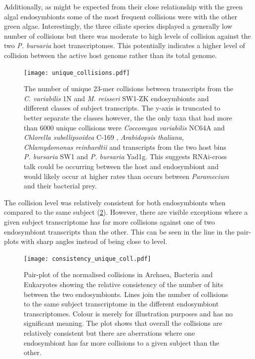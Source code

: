 Additionally, as might be expected from their close relationship with the 
green algal endosymbionts some of the most frequent collisions were 
with the other green algae.
Interestingly, the three ciliate species displayed a generally low number of collisions 
but there was moderate to high levels of collision against the two
\textit{P. bursaria} host transcriptomes.  This potentially
indicates a higher level of collision between the active host genome 
rather than its total genome.

\begin{figure}
    \texttt{[image: unique\_collisions.pdf]}
    \caption[Unique eDicer collisions by subject class]{The number of unique 23-mer
        collisions 
        between transcripts from the \textit{C. variabilis} 1N
    and \textit{M. reisseri} SW1-ZK endosymbionts and different
classes of subject transcripts.  The y-axis is truncated to better
separate the classes however, the the only taxa that had more than 6000
unique collisions were \textit{Coccomyxa variabilis} NC64A and \textit{Chlorella subellipsoidea} C-169
, \textit{Arabidopsis thaliana}, \textit{Chlamydomonas reinhardtii} and transcripts
from the two host bins \textit{P. bursaria} SW1 and \textit{P. bursaria} Yad1g.  
This suggests RNAi-cross talk could be occurring between the host and endosymbiont
and would likely occur at higher rates than occurs between \textit{Paramecium}
and their bacterial prey.}
\label{fig:unique_collisions}
\end{figure}

The collision level was relatively consistent for both endosymbionts
when compared to the same subject (\cref{fig:consistency_most}). 
However, there are visible exceptions where a given subject
transcriptome has far more collisions against one of two
endosymbiont transcripts than the other.  This can be seen
in the line in the pair-plots with sharp angles instead of
being close to level. 

\begin{figure}
    \centering
    \texttt{[image: consistency\_unique\_coll.pdf]}
    \caption[Pair-plot of normalised collisions in both transcriptomes]
    {Pair-plot of the normalised collisions in Archaea, Bacteria
    and Eukaryotes showing the relative consistency of the
number of hits between the two endosymbionts.  Lines join the number
of collisions to the same subject transcriptome in the different
endosymbiont transcriptomes.  Colour is merely for illustration
purposes and has no significant meaning.
The plot shows that overall the collisions are relatively consistent but there
are aberrations where one endosymbiont has far more collisions
to a given subject than the other.}
    \label{fig:consistency_most}
\end{figure}


